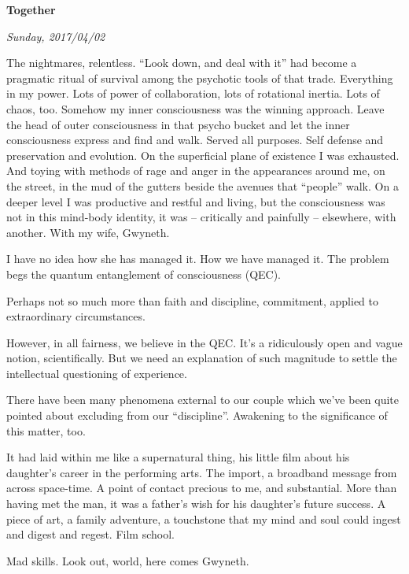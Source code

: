 

\centerline{\bf Together}
\centerline{\it Sunday, 2017/04/02}



\vfill
\break


﻿The nightmares, relentless.  ``Look down, and deal with it'' had
become a pragmatic ritual of survival \break among the psychotic tools of
that trade.  Everything in my power.  Lots of power of collaboration,
lots of rotational inertia.  Lots of chaos, too.  Somehow my inner
consciousness was the winning approach.  Leave the head of outer
consciousness in that psycho bucket and let the inner consciousness
express and find and walk.  Served all purposes.  Self defense and
preservation and evolution.  On the superficial plane of existence I
was exhausted.  And toying with methods of rage and anger in the
appearances around me, on the street, in the mud of the gutters beside
the avenues that ``people'' walk.  On a deeper level I was productive
and restful and living, but the consciousness was not in this
mind-body identity, it was -- critically and painfully -- elsewhere,
with another.  With my wife, Gwyneth.


I have no idea how she has managed it.  How we have managed it.  The
problem begs the quantum entanglement of consciousness (QEC).


Perhaps not so much more than faith and discipline, commitment,
applied to extraordinary circumstances.


However, in all fairness, we believe in the QEC.  It's a ridiculously
open and vague notion, scientifically.  But we need an explanation of
such magnitude to settle the intellectual questioning of experience.


There have been many phenomena external to our couple which we've been
quite pointed about excluding from our ``discipline''.  Awakening to
the significance of this matter, too.


\vfill
\break


﻿It had laid within me like a supernatural thing, his little film about
his daughter's career in the performing arts.  The import, a broadband
message from across space-time.  A point of contact precious to me,
and substantial.  More than having met the man, it was a father's wish
for his daughter's future success.  A piece of art, a family
adventure, a touchstone that my mind and soul could ingest and digest
and regest.  Film school.


Mad skills.  Look out, world, here comes Gwyneth.


